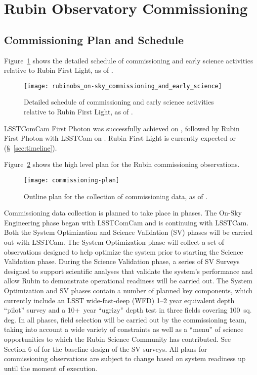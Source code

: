 \section{Rubin Observatory Commissioning}
\label{sec:commissioning}

\subsection{Commissioning Plan and Schedule}
\label{ssec:commissioning-schedule}

Figure~\ref{fig:commissioning-es-schedule} shows the detailed schedule of commissioning and early science activities relative to Rubin First Light, as of \currentdate.
\begin{figure}[htb]
\centering
\texttt{[image: rubinobs\_on-sky\_commissioning\_and\_early\_science]}
\caption{Detailed schedule of commissioning  and early science activities relative to Rubin First Light, as of \currentdate.}
\label{fig:commissioning-es-schedule}
\vspace{0.1cm}
\end{figure}
LSSTComCam First Photon was successfully achieved on \ccfpdate, followed by Rubin  First Photon with LSSTCam on \lcfpdate.
Rubin First Light is currently expected or \rfldate (\S~\ref{sec:timeline}). 

Figure~\ref{fig:commissioning} shows the high level plan for the Rubin commissioning observations. 
\begin{figure}[htb]
\centering
\texttt{[image: commissioning-plan]}
\caption{Outline plan for the collection of commissioning data, as of \currentdate.}
\label{fig:commissioning}
\end{figure}
Commissioning data collection is planned to take place in phases.
The On-Sky Engineering phase began with LSSTComCam and is continuing with LSSTCam.
Both the System Optimization and Science Validation (SV) phases will be carried out with LSSTCam. 
The System Optimization phase will collect a set of observations designed to help optimize the system prior to starting the Science Validation phase.
During the Science Validation phase, a series of SV Surveys designed to support scientific analyses that validate the system's performance and allow Rubin to demonstrate operational readiness will be carried out.
The System Optimization and SV phases contain a number of planned key components, which currently include an LSST wide-fast-deep (WFD) 1--2 year equivalent depth ``pilot'' survey and a 
10+~year ``ugrizy'' depth test in three fields covering 100~sq. deg.
In all phases, field selection will be carried out by the commissioning team, taking into account a wide variety of constraints as well as a ``menu'' of science opportunities to which the Rubin Science Community has contributed.
See Section 6 of  for the baseline design of the SV surveys.
All plans for commissioning observations are subject to change based on system readiness up until the moment of execution. 

